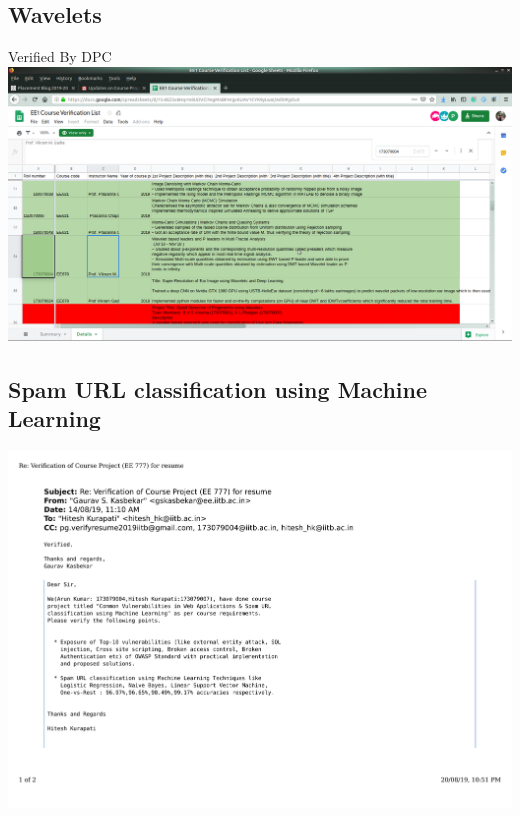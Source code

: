 \documentclass{article}
\begin{document}
	\subsection{Wavelets}
		Verified By DPC\\
		\includegraphics[page=1, scale=0.25]{proofs/wavelets.png}
	\subsection{ Spam URL classification using Machine Learning}
		\includegraphics[page=1, scale=0.5]{proofs/spam_url.pdf}\\
\end{document}
